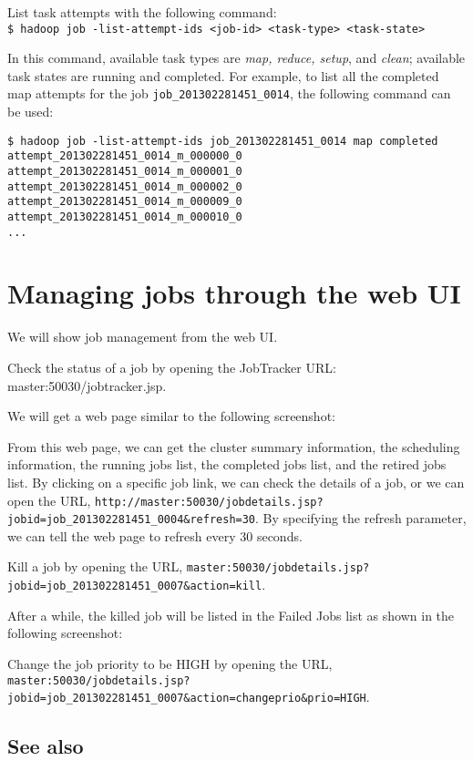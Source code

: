 List task attempts with the following command: \\
\verb|$ hadoop job -list-attempt-ids <job-id> <task-type> <task-state>|

In this command, available task types are \emph{map, reduce, setup}, and \emph{clean}; available task states are running and completed.
For example, to list all the completed map attempts for the job \verb|job_201302281451_0014|, the following command can be used: 
\begin{verbatim}
$ hadoop job -list-attempt-ids job_201302281451_0014 map completed
attempt_201302281451_0014_m_000000_0
attempt_201302281451_0014_m_000001_0
attempt_201302281451_0014_m_000002_0
attempt_201302281451_0014_m_000009_0
attempt_201302281451_0014_m_000010_0
...
\end{verbatim}

\section{Managing jobs through the web UI}
We will show job management from the web UI.

Check the status of a job by opening the JobTracker URL: master:50030/jobtracker.jsp.

We will get a web page similar to the following screenshot:

From this web page, we can get the cluster summary information, the scheduling information, the running jobs list, the completed jobs list, and the retired jobs list. By clicking on a specific job link, we can check the details of a job, or we can open the URL, \verb|http://master:50030/jobdetails.jsp?jobid=job_201302281451_0004&refresh=30|. By specifying the refresh parameter, we can tell the web page to refresh every 30 seconds.

Kill a job by opening the URL, \verb|master:50030/jobdetails.jsp?jobid=job_201302281451_0007&action=kill|.

After a while, the killed job will be listed in the Failed Jobs list as shown in the following screenshot:

Change the job priority to be HIGH by opening the URL, \verb|master:50030/jobdetails.jsp?jobid=job_201302281451_0007&action=changeprio&prio=HIGH|. \\
\subsection*{See also}

